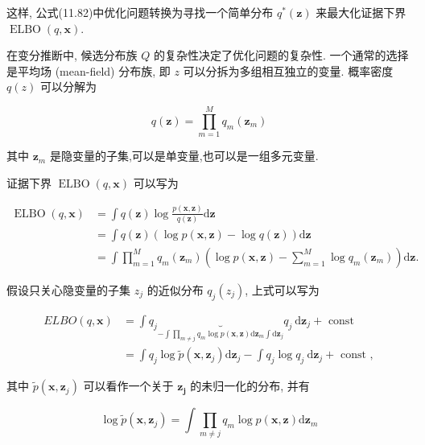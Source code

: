 \documentclass[10pt]{article}
\begin{document}
这样, 公式(11.82)中优化问题转换为寻找一个简单分布 $q^{*}(\boldsymbol{z})$ 来最大化证据下界 $\operatorname{ELBO}(q, \boldsymbol{x})$.

在变分推断中, 候选分布族 $Q$ 的复杂性决定了优化问题的复杂性. 一个通常的选择是平均场 (mean-field) 分布族, 即 $z$ 可以分拆为多组相互独立的变量. 概率密度 $q(z)$ 可以分解为


\begin{equation*}
q(\boldsymbol{z})=\prod_{m=1}^{M} q_{m}\left(\boldsymbol{z}_{m}\right) \tag{11.86}
\end{equation*}


其中 $\boldsymbol{z}_{m}$ 是隐变量的子集,可以是单变量,也可以是一组多元变量.

证据下界 $\operatorname{ELBO}(q, \boldsymbol{x})$ 可以写为


\begin{align*}
\operatorname{ELBO}(q, \boldsymbol{x}) & =\int q(\boldsymbol{z}) \log \frac{p(\boldsymbol{x}, \boldsymbol{z})}{q(\boldsymbol{z})} \mathrm{d} \boldsymbol{z}  \tag{11.87}\\
& =\int q(\boldsymbol{z})(\log p(\boldsymbol{x}, \boldsymbol{z})-\log q(\boldsymbol{z})) \mathrm{d} \boldsymbol{z}  \tag{11.88}\\
& =\int \prod_{m=1}^{M} q_{m}\left(\boldsymbol{z}_{m}\right)\left(\log p(\boldsymbol{x}, \boldsymbol{z})-\sum_{m=1}^{M} \log q_{m}\left(\boldsymbol{z}_{m}\right)\right) \mathrm{d} \boldsymbol{z} . \tag{11.89}
\end{align*}


假设只关心隐变量的子集 $z_{j}$ 的近似分布 $q_{j}\left(z_{j}\right)$, 上式可以写为


\begin{align*}
E L B O(q, \boldsymbol{x}) & =\int q_{j} \underbrace{}_{-\int \prod_{m \neq j} q_{m} \log p(\boldsymbol{x}, \boldsymbol{z}) \mathrm{d} \boldsymbol{z}_{m} \int \mathrm{d} \boldsymbol{z}_{j}} q_{j} \mathrm{~d} \boldsymbol{z}_{j}+\text { const }  \tag{11.90}\\
& =\int q_{j} \log \tilde{p}\left(\boldsymbol{x}, \boldsymbol{z}_{j}\right) \mathrm{d} \boldsymbol{z}_{j}-\int q_{j} \log q_{j} \mathrm{~d} \boldsymbol{z}_{j}+\text { const }, \tag{11.91}
\end{align*}


其中 $\tilde{p}\left(\boldsymbol{x}, \boldsymbol{z}_{j}\right)$ 可以看作一个关于 $\boldsymbol{z}_{\boldsymbol{j}}$ 的未归一化的分布, 并有


\begin{equation*}
\log \tilde{p}\left(\boldsymbol{x}, \boldsymbol{z}_{j}\right)=\int \prod_{m \neq j} q_{m} \log p(\boldsymbol{x}, \boldsymbol{z}) \mathrm{d} \boldsymbol{z}_{m} \tag{11.92}
\end{equation*}
\end{document}
